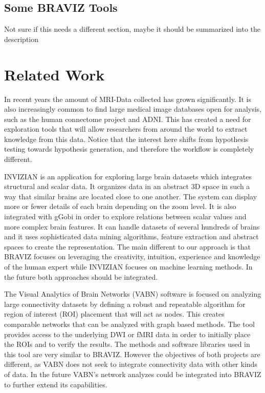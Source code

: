 \documentclass[utf8]{frontiersSCNS} %
\begin{document}


\subsection{Some BRAVIZ Tools}

Not sure if this needs a different section, maybe it should be summarized into the description

\section{Related Work}

In recent years the amount of MRI-Data collected has grown significantly. It is also increasingly common to find large medical image databases open for analysis, such as the human connectome project\citep{rosen_human_2010} and ADNI\citep{jack_alzheimers_2008}. This has created a need for exploration tools that will allow researchers from around the world to extract knowledge from this data. Notice that the interest here shifts from hypothesis testing towards hypothesis generation, and therefore the workflow is completely different.
  
INVIZIAN\citep{bowman_query-based_2011,bowman_feature-similarity_2012} is an application for exploring large brain datasets which integrates structural and scalar data. It organizes data in an abstract 3D space in such a way that similar brains are located close to one another. The system can display more or fewer details of each brain depending on the zoom level. It is also integrated with gGobi\citep{cook_interactive_2007} in order to explore relations between scalar values and more complex brain features. It can handle datasets of several hundreds of brains and it uses sophisticated data mining algorithms, feature extraction and abstract spaces to create the representation. The main different to our approach is that BRAVIZ focuses on leveraging the creativity, intuition, experience and knowledge of the human expert while INVIZIAN focuses on machine learning methods. In the future both approaches should be integrated.

The Visual Analytics of Brain Networks\citep{li_visual_2012} (VABN) software is focused on analyzing large connectivity datasets by defining a robust and repeatable algorithm for region of interest (ROI) placement that will act as nodes. This creates comparable networks that can be analyzed with graph based methods. The tool provides access to the underlying DWI or fMRI data in order to initially place the ROIs and to verify the results. The methods and software libraries used in this tool are very similar to BRAVIZ. However the objectives of both projects are different, as VABN does not seek to integrate connectivity data with other kinds of data. In the future VABN’s network analyzes could be integrated into BRAVIZ to further extend its capabilities.
\end{document}
